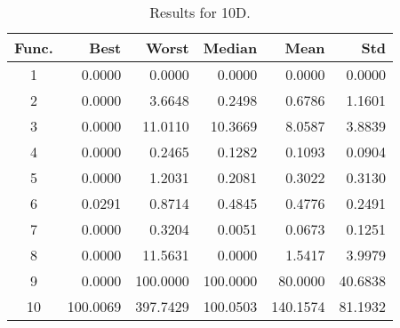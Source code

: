 \begin{table}[ht]
\centering
\caption{ Results for 10D. }
\label{tab:10D}
\begin{tabular}{crrrrr}
\hline
{Func.} & Best & Worst & Median & Mean & Std \\
\hline
1 & 0.0000 & 0.0000 & 0.0000 & 0.0000 & 0.0000 \\
2 & 0.0000 & 3.6648 & 0.2498 & 0.6786 & 1.1601 \\
3 & 0.0000 & 11.0110 & 10.3669 & 8.0587 & 3.8839 \\
4 & 0.0000 & 0.2465 & 0.1282 & 0.1093 & 0.0904 \\
5 & 0.0000 & 1.2031 & 0.2081 & 0.3022 & 0.3130 \\
6 & 0.0291 & 0.8714 & 0.4845 & 0.4776 & 0.2491 \\
7 & 0.0000 & 0.3204 & 0.0051 & 0.0673 & 0.1251 \\
8 & 0.0000 & 11.5631 & 0.0000 & 1.5417 & 3.9979 \\
9 & 0.0000 & 100.0000 & 100.0000 & 80.0000 & 40.6838 \\
10 & 100.0069 & 397.7429 & 100.0503 & 140.1574 & 81.1932 \\
\hline
\end{tabular}
\end{table}
